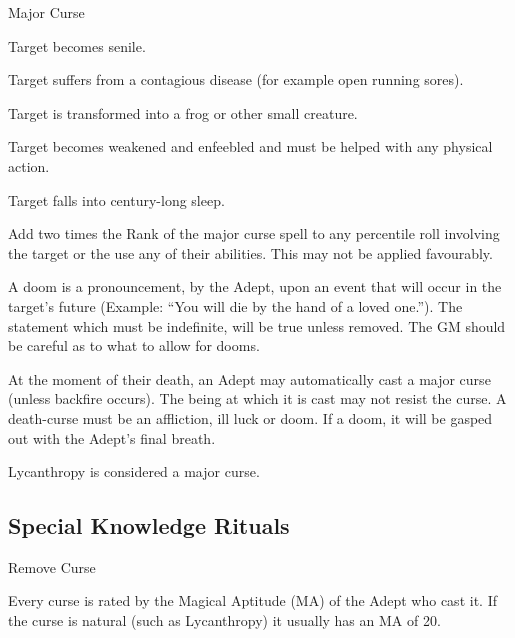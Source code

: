 \begin{multicols}{3}
\begin{spell}[]{Major Curse}
\begin{effects}
\begin{Description}
\begin{Enumerate}
\item
Target becomes senile. 

\item
Target suffers from a contagious disease (for example open running sores). 

\item
Target is transformed into a frog or other small creature.

\item
Target becomes weakened and enfeebled and must be helped with any
physical action.
\item
Target falls into century-long sleep.
\end{Enumerate}

\item[Ill  Luck]
Add two times the Rank of the major curse spell to any percentile roll
involving the target or the use any of their abilities.  This may not
be applied favourably.

\item[Doom]
A doom is a pronouncement, by the Adept, upon an event that will occur
in the target's future (Example: ``You will die by the hand of a loved
one.'').  The statement which must be indefinite, will be true unless
removed.  The GM should be careful as to what to allow for dooms.

\item[Death-curse]
At the moment of their death, an Adept may automatically cast a major
curse (unless backfire occurs).  The being at which it is cast may not
resist the curse.  A death-curse must be an affliction, ill luck or
doom.  If a doom, it will be gasped out with the Adept's final breath.

\item[Note]
Lycanthropy is considered a major curse.
\end{Description}
\end{effects}
\end{spell}

\subsection{Special Knowledge Rituals}

\begin{ritual}[]{Remove Curse}
\label{ritual:removecurse}
\begin{effects}
Every curse is rated by the Magical Aptitude (MA) of the Adept who
cast it.  If the curse is natural (such as Lycanthropy) it usually has
an MA of 20.


\end{effects}
\end{ritual}
\end{multicols}

